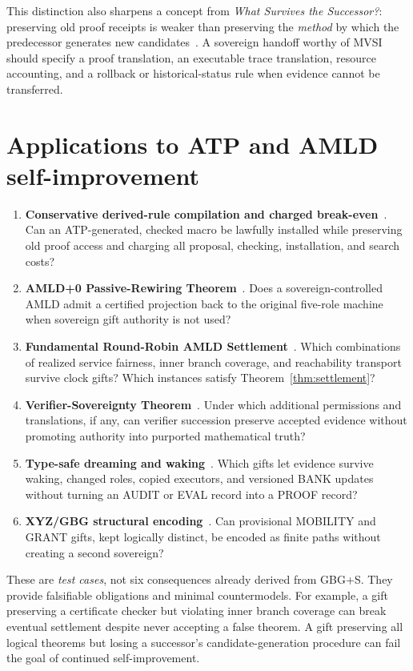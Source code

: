 \documentclass[11pt,letterpaper]{article}
\theoremstyle{remark}
\begin{document}
This distinction also sharpens a concept from \emph{What Survives the Successor?}: preserving old proof receipts is weaker than preserving the \emph{method} by which the predecessor generates new candidates~\cite{Successor}. A sovereign handoff worthy of MVSI should specify a proof translation, an executable trace translation, resource accounting, and a rollback or historical-status rule when evidence cannot be transferred.

\section{Applications to ATP and AMLD self-improvement}
\begin{enumerate}[label=\arabic*.,leftmargin=1.8em,itemsep=0.45em]
\item \textbf{Conservative derived-rule compilation and charged break-even}~\cite{Successor}. Can an ATP-generated, checked macro be lawfully installed while preserving old proof access and charging all proposal, checking, installation, and search costs?
\item \textbf{AMLD+0 Passive-Rewiring Theorem}~\cite{AMLD0}. Does a sovereign-controlled AMLD admit a certified projection back to the original five-role machine when sovereign gift authority is not used?
\item \textbf{Fundamental Round-Robin AMLD Settlement}~\cite{RoundRobin}. Which combinations of realized service fairness, inner branch coverage, and reachability transport survive clock gifts? Which instances satisfy Theorem~\ref{thm:settlement}?
\item \textbf{Verifier-Sovereignty Theorem}~\cite{Graduation}. Under which additional permissions and translations, if any, can verifier succession preserve accepted evidence without promoting authority into purported mathematical truth?
\item \textbf{Type-safe dreaming and waking}~\cite{Dreaming}. Which gifts let evidence survive waking, changed roles, copied executors, and versioned BANK updates without turning an AUDIT or EVAL record into a PROOF record?
\item \textbf{XYZ/GBG structural encoding}~\cite{GBG,GBGp}. Can provisional MOBILITY and GRANT gifts, kept logically distinct, be encoded as finite paths without creating a second sovereign?
\end{enumerate}

These are \emph{test cases}, not six consequences already derived from GBG+S. They provide falsifiable obligations and minimal countermodels. For example, a gift preserving a certificate checker but violating inner branch coverage can break eventual settlement despite never accepting a false theorem. A gift preserving all logical theorems but losing a successor's candidate-generation procedure can fail the goal of continued self-improvement.
\end{document}
